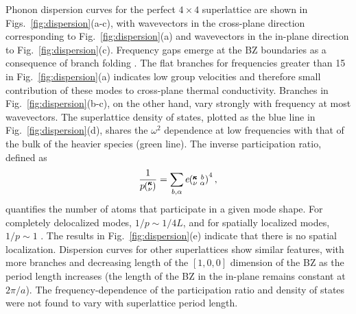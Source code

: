 Phonon dispersion curves for the perfect $4\times4$ superlattice are shown in Figs.~\ref{fig:dispersion}(a-c), with wavevectors in the cross-plane direction corresponding to Fig.~\ref{fig:dispersion}(a) and wavevectors in the in-plane direction to Fig.~\ref{fig:dispersion}(c). Frequency gaps emerge at the BZ boundaries as a consequence of branch folding \cite{PhysRevB.38.1427,PhysRevB.60.2627}. The flat branches for frequencies greater than 15 in Fig.~\ref{fig:dispersion}(a) indicates low group velocities and therefore small contribution of these modes to cross-plane thermal conductivity. Branches in Fig.~\ref{fig:dispersion}(b-c), on the other hand, vary strongly with frequency at most wavevectors. The superlattice density of states, plotted as the blue line in Fig.~\ref{fig:dispersion}(d), shares the $\omega^2$ dependence at low frequencies with that of the bulk of the heavier species (green line). The inverse participation ratio, defined as 
\begin{equation}\label{EQ:P_ratio}
\begin{split}
\frac{1}{p\mspace{-4.0mu}\left(\mspace{-8.0mu} \begin{smallmatrix}&\pmb{\kappa} \\&\nu\end{smallmatrix} \mspace{-3.0mu}\right)}=\sum_{b,\alpha}e\mspace{-4.0mu}\left(\mspace{-8.0mu} \begin{smallmatrix} &\pmb{\kappa} &b \\ &\nu &\alpha\end{smallmatrix} \mspace{-3.0mu}\right)^4,
\end{split}
\end{equation}
quantifies the number of atoms that participate in a given mode shape. For completely delocalized modes, $1/p\sim 1/4L$, and for spatially localized modes, $1/p\sim 1$ \cite{PhysRevB.70.235214}. The results in Fig.~\ref{fig:dispersion}(e) indicate that there is no spatial localization.  Dispersion curves for other superlattices show similar features, with more branches and decreasing length of the $[1,0,0]$ dimension of the BZ as the period length increases (the length of the BZ in the in-plane remains constant at $2\pi/a$). The frequency-dependence of the participation ratio and density of states were not found to vary with superlattice period length.
\renewcommand{\topfraction}{0.7}
\begin{figure*}%
\begin{center}
\renewcommand{\figure}{Fig.}
\caption{(a,b,c) Dispersion, (d) density of states and (e) inverse participation ratio for a $4\times4$ superlattice. Labeled gray squares represent select modes for Fig.~\ref{fig:sed}. X-$\Gamma$ corresponds to wavevectors along the CP ([1,0,0]) direction, $\Gamma$-A corresponds to wavevectors along the [1,1,1] direction and Z-$\Gamma$ corresponds to wavevectors along the IP ([0,1,0]) direction. Orange lines correspond the bulk of the lighter species and green lines correspond to the bulk of the heavier species.}
\label{fig:dispersion}
\end{center}
\end{figure*}

